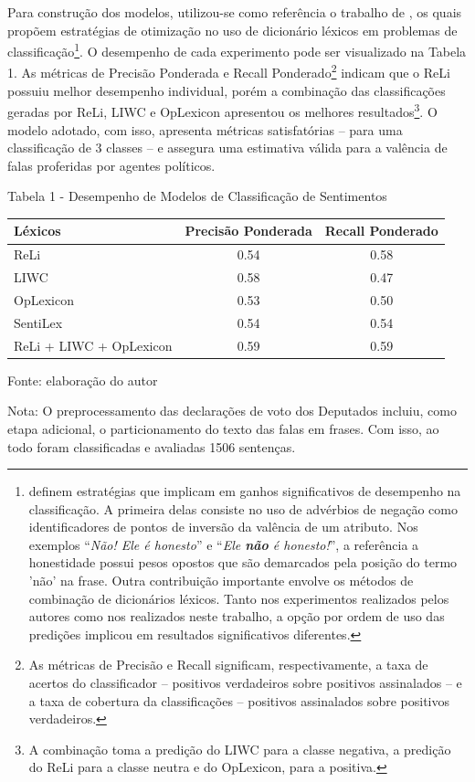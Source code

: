 \documentclass[
12pt,				%
openright,			%
twoside,			%
a4paper,			%
english,			%
french,				%
spanish,			%
brazil				%
]{abntex2}
\begin{document}
Para construção dos modelos, utilizou-se como referência o trabalho de , os quais propõem estratégias de otimização no uso de dicionário léxicos em problemas de classificação\footnote{ definem estratégias que implicam em ganhos significativos de desempenho na classificação. A primeira delas consiste no uso de advérbios de negação como identificadores de pontos de inversão da valência de um atributo. Nos exemplos ``\textit{Não! Ele é honesto}'' e ``\textit{Ele \textbf{não} é honesto!}'', a referência a honestidade possui pesos opostos que são demarcados pela posição do termo 'não' na frase. Outra contribuição importante envolve os métodos de combinação de dicionários léxicos. Tanto nos experimentos realizados pelos autores como nos realizados neste trabalho, a opção por ordem de uso das predições implicou em resultados significativos diferentes.}. O desempenho de cada experimento pode ser visualizado na Tabela 1. As métricas de Precisão Ponderada e Recall Ponderado\footnote{As métricas de Precisão e Recall significam, respectivamente, a taxa de acertos do classificador -- positivos verdadeiros sobre positivos assinalados -- e a taxa de cobertura da classificações -- positivos assinalados sobre positivos verdadeiros.} indicam que o ReLi possuiu melhor desempenho individual, porém a combinação das classificações geradas por ReLi, LIWC e OpLexicon apresentou os melhores resultados\footnote{A combinação toma a predição do LIWC para a classe negativa, a predição do ReLi para a classe neutra e do OpLexicon, para a positiva.}. O modelo adotado, com isso, apresenta métricas satisfatórias -- para uma classificação de 3 classes -- e assegura uma estimativa válida para a valência de falas proferidas por agentes políticos.   

\newpage
\begin{center}
	Tabela 1 - Desempenho de Modelos de Classificação de Sentimentos
	
	\vspace{0.4cm}
	
	\begin{tabular}{lcc}
		\toprule
		{Léxicos}					& {Precisão Ponderada} 	& {Recall Ponderado} \\ \midrule
		{ReLi} 						& 0.54					& 0.58 \\ 
		{LIWC} 						& 0.58					& 0.47 \\ 
		{OpLexicon} 				& 0.53					& 0.50 \\ 
		{SentiLex} 					& 0.54					& 0.54 \\ 
		{ReLi + LIWC + OpLexicon} 	& 0.59					& 0.59 \\ 
		\bottomrule
	\end{tabular}
	
	\vspace{0.6cm}
	
	Fonte: elaboração do autor
	\begin{flushleft}
		Nota: O preprocessamento das declarações de voto dos Deputados incluiu, como etapa adicional, o particionamento do texto das falas em frases. Com isso, ao todo foram classificadas e avaliadas 1506 sentenças.
	\end{flushleft}
\end{center}     
\end{document}
